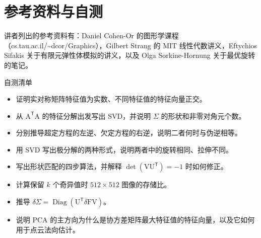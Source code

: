 \documentclass[a4paper]{article}
\begin{document}
\section{参考资料与自测}

讲者列出的参考资料有：Daniel Cohen-Or 的图形学课程（cs.tau.ac.il/\textasciitilde dcor/Graphics），Gilbert Strang 的 MIT 线性代数讲义，Eftychios Sifakis 关于有限元弹性体模拟的讲义，以及 Olga Sorkine-Hornung 关于最优旋转的笔记。

\begin{practicebox}{自测清单}
\begin{itemize}
\item 证明实对称矩阵特征值为实数、不同特征值的特征向量正交。
\item 从 $\mathrm A^{\mathsf T}\mathrm A$ 的特征分解出发写出 SVD，并说明 $\Sigma$ 的形状和非零对角元个数。
\item 分别推导超定方程的左逆、欠定方程的右逆，说明二者何时与伪逆相等。
\item 用 SVD 写出极分解的两种形式，说明两者中的旋转相同、拉伸不同。
\item 写出形状匹配的四步算法，并解释 $\det(\mathrm V\mathrm U^{\mathsf T})=-1$ 时如何修正。
\item 计算保留 $k$ 个奇异值时 $512\times512$ 图像的存储比。
\item 推导 $\delta\Sigma=\operatorname{Diag}(\mathrm U^{\mathsf T}\delta\mathrm F\mathrm V)$。
\item 说明 PCA 的主方向为什么是协方差矩阵最大特征值的特征向量，以及它如何用于点云法向估计。
\end{itemize}
\end{practicebox}
\end{document}
